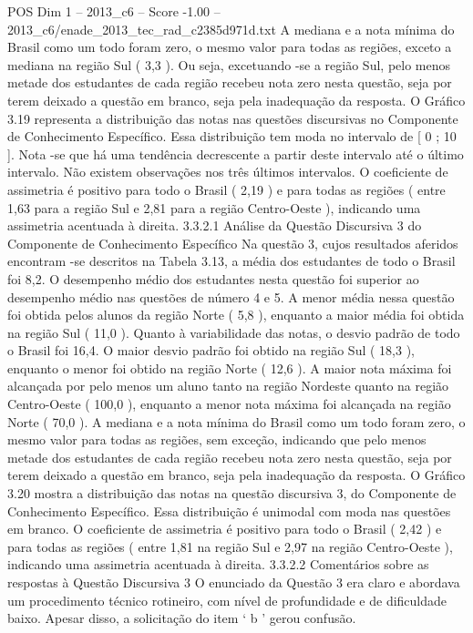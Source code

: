 \begin{textsample}{POS Dim 1 – 2013\_c6 – Score -1.00 – 2013\_c6/enade\_2013\_tec\_rad\_c2385d971d.txt}
A mediana e a nota mínima do Brasil como um todo foram zero, o mesmo valor para todas as regiões, exceto a mediana na região Sul ( 3,3 ).
Ou seja, excetuando -se a região Sul, pelo menos metade dos estudantes de cada região recebeu nota zero nesta questão, seja por terem deixado a questão em branco, seja pela inadequação da resposta.
O Gráfico 3.19 representa a distribuição das notas nas questões discursivas no Componente de Conhecimento Específico.
Essa distribuição tem moda no intervalo de [ 0 ; 10 ].
Nota -se que há uma tendência decrescente a partir deste intervalo até o último intervalo.
Não existem observações nos três últimos intervalos.
O coeficiente de assimetria é positivo para todo o Brasil ( 2,19 ) e para todas as regiões ( entre 1,63 para a região Sul e 2,81 para a região Centro-Oeste ), indicando uma assimetria acentuada à direita. 3.3.2.1 Análise da Questão Discursiva 3 do Componente de Conhecimento Específico Na questão 3, cujos resultados aferidos encontram -se descritos na Tabela 3.13, a média dos estudantes de todo o Brasil foi 8,2.
O desempenho médio dos estudantes nesta questão foi superior ao desempenho médio nas questões de número 4 e 5.
A menor média nessa questão foi obtida pelos alunos da região Norte ( 5,8 ), enquanto a maior média foi obtida na região Sul ( 11,0 ).
Quanto à variabilidade das notas, o desvio padrão de todo o Brasil foi 16,4.
O maior desvio padrão foi obtido na região Sul ( 18,3 ), enquanto o menor foi obtido na região Norte ( 12,6 ).
A maior nota máxima foi alcançada por pelo menos um aluno tanto na região Nordeste quanto na região Centro-Oeste ( 100,0 ), enquanto a menor nota máxima foi alcançada na região Norte ( 70,0 ).
A mediana e a nota mínima do Brasil como um todo foram zero, o mesmo valor para todas as regiões, sem exceção, indicando que pelo menos metade dos estudantes de cada região recebeu nota zero nesta questão, seja por terem deixado a questão em branco, seja pela inadequação da resposta.
O Gráfico 3.20 mostra a distribuição das notas na questão discursiva 3, do Componente de Conhecimento Específico.
Essa distribuição é unimodal com moda nas questões em branco.
O coeficiente de assimetria é positivo para todo o Brasil ( 2,42 ) e para todas as regiões ( entre 1,81 na região Sul e 2,97 na região Centro-Oeste ), indicando uma assimetria acentuada à direita. 3.3.2.2 Comentários sobre as respostas à Questão Discursiva 3 O enunciado da Questão 3 era claro e abordava um procedimento técnico rotineiro, com nível de profundidade e de dificuldade baixo.
Apesar disso, a solicitação do item ‘ b ’ gerou confusão.

\end{textsample}
